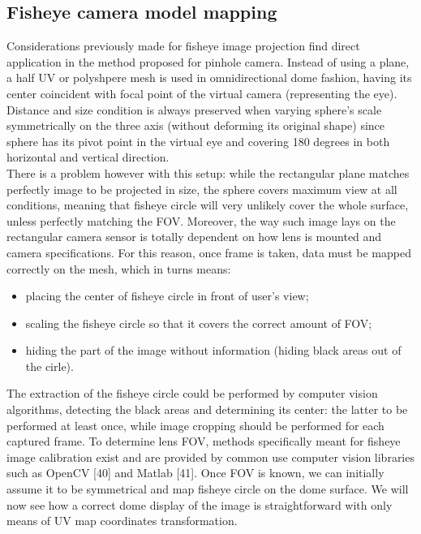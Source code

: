 \subsection{Fisheye camera model mapping}
Considerations previously made for fisheye image projection find direct application in the method proposed for pinhole camera. Instead of using a plane, a half UV or polyshpere mesh is used in omnidirectional dome fashion, having its center coincident with focal point of the virtual camera (representing the eye). Distance and size condition is always preserved when varying sphere's scale symmetrically on the three axis (without deforming its original shape) since sphere has its pivot point in the virtual eye and covering 180 degrees in both horizontal and vertical direction.\\
There is a problem however with this setup: while the rectangular plane matches perfectly image to be projected in size, the sphere covers maximum view at all conditions, meaning that fisheye circle will very unlikely cover the whole surface, unless perfectly matching the FOV. Moreover, the way such image lays on the rectangular camera sensor is totally dependent on how lens is mounted and camera specifications. For this reason, once frame is taken, data must be mapped correctly on the mesh, which in turns means:
\begin{itemize}
\item placing the center of fisheye circle in front of user's view;
\item scaling the fisheye circle so that it covers the correct amount of FOV;
\item hiding the part of the image without information (hiding black areas out of the cirle).
\end{itemize}
The extraction of the fisheye circle could be performed by computer vision algorithms, detecting the black areas and determining its center: the latter to be performed at least once, while image cropping should be performed for each captured frame. To determine lens FOV, methods specifically meant for fisheye image calibration exist and are provided by common use computer vision libraries such as OpenCV [40] and Matlab [41]. Once FOV is known, we can initially assume it to be symmetrical and map fisheye circle on the dome surface. We will now see how a correct dome display of the image is straightforward with only means of UV map coordinates transformation.\\

